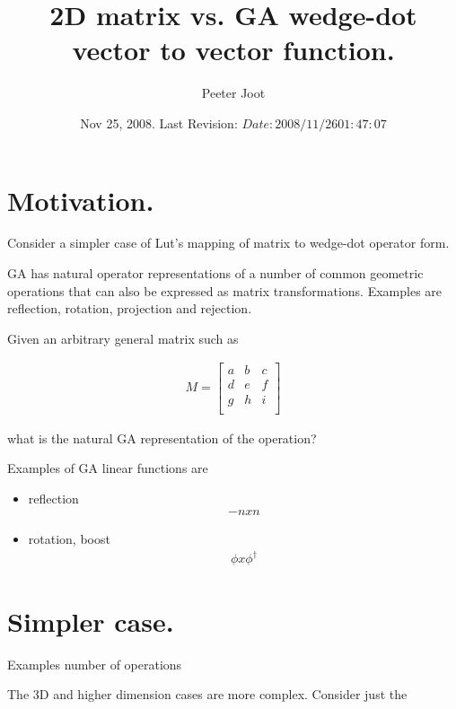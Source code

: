 \documentclass{article}
\title{ 2D matrix vs. GA wedge-dot vector to vector function. }
\author{Peeter Joot}
\date{ Nov 25, 2008.  Last Revision: $Date: 2008/11/26 01:47:07 $ }
\begin{document}
\maketitle{}

\section{ Motivation. }

Consider a simpler case of Lut's mapping of matrix to wedge-dot operator form.

GA has natural operator representations of a number of common geometric
operations that can also be expressed as matrix transformations.  Examples
are reflection, rotation, projection and rejection.

Given an arbitrary general matrix such as 

\begin{align*}
M = 
\begin{bmatrix}
a & b & c \\
d & e & f \\
g & h & i \\
\end{bmatrix}
\end{align*}

what is the natural GA representation of the operation?

Examples of GA linear functions are

\begin{itemize}
\item reflection
\begin{align*}
-n x n
\end{align*}

\item rotation, boost
\begin{align*}
\phi x \phi^\dagger
\end{align*}


\end{itemize}

\section{ Simpler case. }

Examples  number of operations 

The 3D and higher dimension cases are more complex.  Consider just the 

%
%
\end{document}
